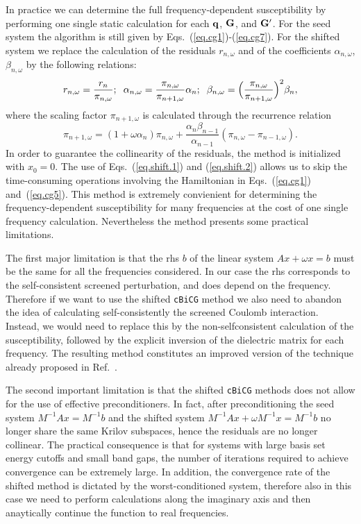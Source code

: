 \documentclass[twocolumn,prb,showpacs,superscriptaddress]{revtex4}
\def\w{\omega}
\def\q{{\bf q}}
\def\G{{\bf G}}
\def\Gp{{\bf G^\prime}}
\begin{document}
In practice we can determine the
full frequency-dependent susceptibility 
by performing one single static calculation for each $\q$, $\G$, and $\Gp$.
For the seed system the algorithm is still given by Eqs.\ (\ref{eq.cg1})-(\ref{eq.cg7}).
For the shifted system we replace the calculation of the residuals
$r_{n,\w}$ and of the coefficients $\alpha_{n,\w}$, $\beta_{n,\w}$ by the following relations:
  \begin{equation} \label{eq.shift.1}
  r_{n,\w}  =\frac{r_n}{\pi_{n,\w}};
  \hspace{0.2cm}
  \alpha_{n,\w}  =  \frac{\pi_{n,\w}}{\pi_{n+1,\w}}\alpha_n ;
  \hspace{0.2cm}
  \beta_{n,\w}  =  \Big(\frac{\pi_{n,\w}}{\pi_{n+1,\w}}\Big)^2\beta_n,
  \end{equation}
where the scaling factor $\pi_{n+1,\w}$ is calculated through the recurrence relation
  \begin{equation}\label{eq.shift.2}
  \pi_{n+1,\w} = (1+\w\alpha_n) \pi_{n,\w} + \frac{\alpha_n\beta_{n-1}}{\alpha_{n-1}}(\pi_{n,\w}-\pi_{n-1,\w}).
  \end{equation}
In order to guarantee the collinearity of the residuals, the method
is initialized with $x_0=0$.
The use of Eqs.~(\ref{eq.shift.1}) and (\ref{eq.shift.2}) allows us to
skip the time-consuming operations involving the Hamiltonian in
Eqs.\ (\ref{eq.cg1}) and~(\ref{eq.cg5}).
This method is extremely convienient for determining the frequency-dependent
susceptibility for many frequencies at the cost of one single frequency calculation.
Nevertheless the method presents some practical limitations.

The first major limitation is that the rhs $b$ of the linear system $Ax+\w x=b$
must be the same for all the frequencies considered. In our case
the rhs corresponds to the self-consistent screened perturbation, 
and does depend on the frequency. Therefore if we want to use the
shifted {\tt cBiCG} method we also need to abandon the idea of 
calculating self-consistently the screened Coulomb interaction. 
Instead, we would need to replace this 
by the non-selfconsistent calculation of the susceptibility, followed 
by the explicit inversion of the dielectric matrix for each frequency.
The resulting method constitutes an improved version of the technique
already proposed in Ref.\ .

The second important limitation is that the shifted {\tt cBiCG} methods
does not allow for the use of effective preconditioners. In fact,
after preconditioning the seed system $M^{-1}Ax=M^{-1}b$ and the shifted
system $M^{-1}Ax+\w M^{-1}x=M^{-1}b$ no longer share the same Krilov subspaces, 
hence the residuals are no longer collinear.\cite{simoncini} 
The practical consequence is that for systems with
large basis set energy cutoffs and small band gaps, the number of iterations
required to achieve convergence can be extremely large.
In addition, the convergence rate of the shifted method is dictated
by the worst-conditioned system, therefore also in this case
we need to perform calculations along the imaginary axis and then anaytically
continue the function to real frequencies.
\end{document}
